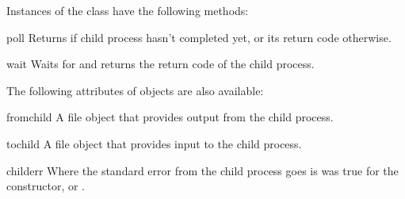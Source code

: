 Instances of the  class have the following methods:

\begin{methoddesc}{poll}{}
Returns  if child process hasn't completed yet, or its return 
code otherwise.
\end{methoddesc}

\begin{methoddesc}{wait}{}
Waits for and returns the return code of the child process.
\end{methoddesc}


The following attributes of  objects are also available: 

\begin{datadesc}{fromchild}
A file object that provides output from the child process.
\end{datadesc}

\begin{datadesc}{tochild}
A file object that provides input to the child process.
\end{datadesc}

\begin{datadesc}{childerr}
Where the standard error from the child process goes is
 was true for the constructor, or .
\end{datadesc}
